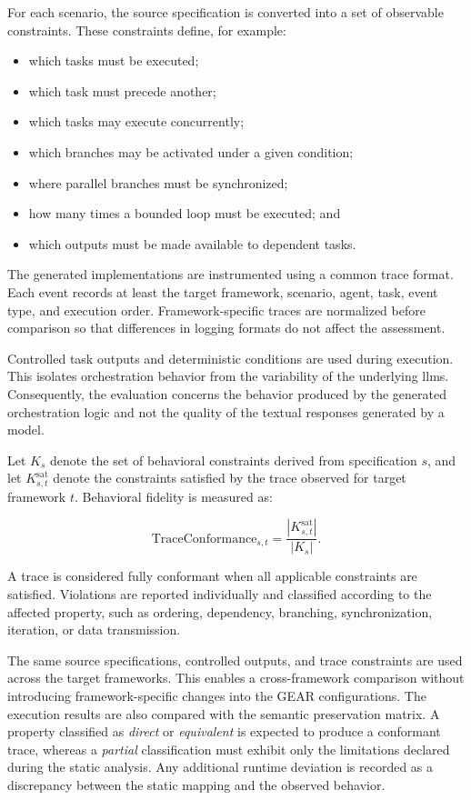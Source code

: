 For each scenario, the source specification is converted into a set of observable
constraints. These constraints define, for example:

\begin{itemize}
    \item which tasks must be executed;
    \item which task must precede another;
    \item which tasks may execute concurrently;
    \item which branches may be activated under a given condition;
    \item where parallel branches must be synchronized;
    \item how many times a bounded loop must be executed; and
    \item which outputs must be made available to dependent tasks.
\end{itemize}

The generated implementations are instrumented using a common trace format. Each
event records at least the target framework, scenario, agent, task, event type,
and execution order. Framework-specific traces are normalized before comparison
so that differences in logging formats do not affect the assessment.

Controlled task outputs and deterministic conditions are used during execution.
This isolates orchestration behavior from the variability of the underlying
\gls{llm}s. Consequently, the evaluation concerns the behavior produced by the
generated orchestration logic and not the quality of the textual responses
generated by a model.

Let \(K_s\) denote the set of behavioral constraints derived from specification
\(s\), and let \(K^{\mathrm{sat}}_{s,t}\) denote the constraints satisfied by the
trace observed for target framework \(t\). Behavioral fidelity is measured as:

\begin{equation}
    \mathrm{TraceConformance}_{s,t} =
    \frac{|K^{\mathrm{sat}}_{s,t}|}{|K_s|}.
\end{equation}

A trace is considered fully conformant when all applicable constraints are
satisfied. Violations are reported individually and classified according to the
affected property, such as ordering, dependency, branching, synchronization,
iteration, or data transmission.

The same source specifications, controlled outputs, and trace constraints are
used across the target frameworks. This enables a cross-framework comparison
without introducing framework-specific changes into the GEAR configurations.
The execution results are also compared with the semantic preservation matrix.
A property classified as \emph{direct} or \emph{equivalent} is expected to
produce a conformant trace, whereas a \emph{partial} classification must exhibit
only the limitations declared during the static analysis. Any additional runtime
deviation is recorded as a discrepancy between the static mapping and the
observed behavior.